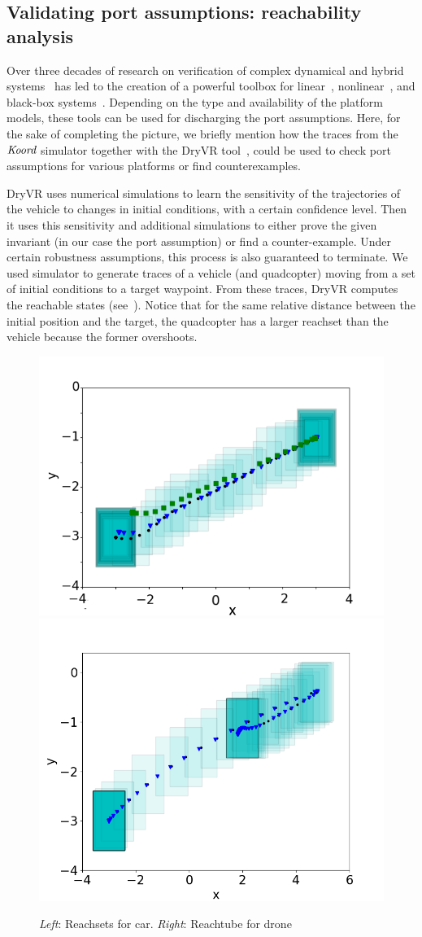 \subsection{Validating port assumptions: reachability analysis}
\label{sec:port-assumptions}
 Over  three decades of research on verification of complex dynamical and hybrid systems~\cite{Alur:2015:PCS,Platzer:2018} has led to the creation of a powerful toolbox for linear~\cite{bak2017hylaa,Spaceex}, nonlinear~\cite{CAS13,DMVemsoft2013,FanQM0D16:CAV}, and black-box systems~\cite{DryVR2017}. Depending on the type and availability of the platform models, these tools can be used for discharging the port assumptions. Here, for the sake of completing the picture, we briefly mention how the traces from the $\emph{Koord}$ simulator together with the DryVR tool~\cite{DryVR2017},  could be used to check port assumptions for various platforms or find counterexamples. 
 
 DryVR uses numerical simulations to learn the sensitivity of the trajectories of the vehicle to changes in initial conditions, with a certain confidence level. Then it uses this sensitivity and additional simulations to either prove the given invariant (in our case the port assumption) or find a counter-example. Under certain robustness assumptions, this process is also guaranteed to terminate. We used \lgname simulator to generate traces of a vehicle (and quadcopter) moving from a set of initial conditions to a target waypoint. From these traces, DryVR computes the reachable states (see~). Notice that for the same relative distance between the initial position and the target, the quadcopter has a larger reachset than the vehicle because the former overshoots. 
\begin{figure}[!h]
            \captionsetup{font=scriptsize}
    \includegraphics[width=0.4\linewidth]{figs/car_trajs.png}
    \includegraphics[width=0.4\linewidth]{figs/drone_trajs.png}
    \caption{\emph{Left}: Reachsets  for car. \emph{Right}: Reachtube for drone}
    \label{fig:dryVR}
\end{figure}